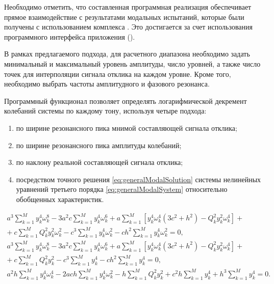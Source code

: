 Необходимо отметить, что составленная программная реализация обеспечивает прямое взаимодействие с результатами модальных испытаний, которые были получены с использованием комплекса . Это достигается за счет использования программного интерфейса приложения  ().

В рамках предлагаемого подхода, для расчетного диапазона необходимо задать минимальный и максимальный уровень амплитуды, число уровней, а также число точек для интерполяции сигнала отклика на каждом уровне. Кроме того, необходимо выбрать частоты амплитудного и фазового резонанса.

Программный функционал позволяет определять логарифмической декремент колебаний системы по каждому тону, используя четыре подхода:
\begin{enumerate}
	\item по ширине резонансного пика мнимой составляющей сигнала отклика;
	\item по ширине резонансного пика амплитуды колебаний;
	\item по наклону реальной составляющей сигнала отклика;
	\item посредством точного решения \eqref{eq:generalModalSolution} системы нелинейных уравнений третьего порядка \eqref{eq:generalModalSystem} относительно обобщенных характеристик. \label{struct:general-characteristics-approach}
\end{enumerate}

\begin{equation}
	\begin{aligned}
		a ^ 3 \sum_{k = 1} ^ M y_k ^ 4 \omega_k ^ 8 - 3 a ^ 2 c \sum_{k = 1} ^ M y_k ^ 4 \omega_k ^ 6 + a \sum_{k = 1} ^ M \left[ y_k ^ 4 \omega_k ^ 4 \left(3 c ^ 2 + h ^ 2 \right) - Q_k ^ 2 y_k ^ 2 \omega_k ^ 4 \right] + \\
		+ \ c \sum_{k = 1} ^ M Q_k ^ 2 y_k ^ 2 \omega_k ^ 2 - c ^ 3 \sum_{k = 1} ^ M y_k ^ 4 \omega_k ^ 2 - c h ^ 2 \sum_{k = 1} ^ M y_k ^ 4 \omega_k ^ 2 = 0, \\
		a ^ 3 \sum_{k = 1} ^ M y_k ^ 4 \omega_k ^ 8 - 3 a ^ 2 c \sum_{k = 1} ^ M y_k ^ 4 \omega_k ^ 6 + a \sum_{k = 1} ^ M \left[ y_k ^ 4 \omega_k ^ 4 \left(3 c ^ 2 + h ^ 2 \right) - Q_k ^ 2 y_k ^ 2 \omega_k ^ 4 \right] + \\
		+ \ c \sum_{k = 1} ^ M Q_k ^ 2 y_k ^ 2 - c ^ 3 \sum_{k = 1} ^ M y_k ^ 4 - c h ^ 2 \sum_{k = 1} ^ M y_k ^ 4 = 0, \\
		a ^ 2 h \sum_{k = 1} ^ M y_k ^ 4 \omega_k ^ 4 - 2 a c h \sum_{k = 1} ^ M y_k ^ 4 \omega_k ^ 2 - h \sum_{k = 1} ^ M Q_k ^ 2 y_k ^ 2 + c ^ 2 h \sum_{k = 1} ^ M y_k ^ 4 + h ^ 3 \sum_{k = 1} ^ M y_k ^ 4 = 0. 
	\end{aligned}
	\label{eq:generalModalSystem}
\end{equation}

